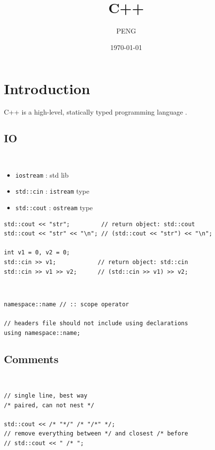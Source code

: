 \documentclass{article}
\title{C++}
\author{PENG}
\date{\today}
\begin{document}
\maketitle
\tableofcontents
\section{Introduction}
C++ is a high-level, statically typed programming language \cite{LIPPMAN_2012_CPP_PRIMER}.

\subsection{IO}
\begin{definition}[IO objects]~
    \begin{itemize}
        \item \verb|iostream| : std lib
        \item \verb|std::cin| : \verb|istream| type
        \item \verb|std::cout| : \verb|ostream| type
    \end{itemize}
    \begin{verbatim}
std::cout << "str";         // return object: std::cout
std::cout << "str" << "\n"; // (std::cout << "str") << "\n";

int v1 = 0, v2 = 0;
std::cin >> v1;            // return object: std::cin
std::cin >> v1 >> v2;      // (std::cin >> v1) >> v2;
\end{verbatim}
\end{definition}

\begin{definition}[namespace]~
    \begin{verbatim}
namespace::name // :: scope operator

// headers file should not include using declarations
using namespace::name;
\end{verbatim}
\end{definition}

\subsection{Comments}
\begin{definition}[comment]~
    \begin{verbatim}
// single line, best way
/* paired, can not nest */

std::cout << /* "*/" /* "/*" */;
// remove everything between */ and closest /* before
// std::cout << " /* ";
\end{verbatim}
\end{definition}
\end{document}
